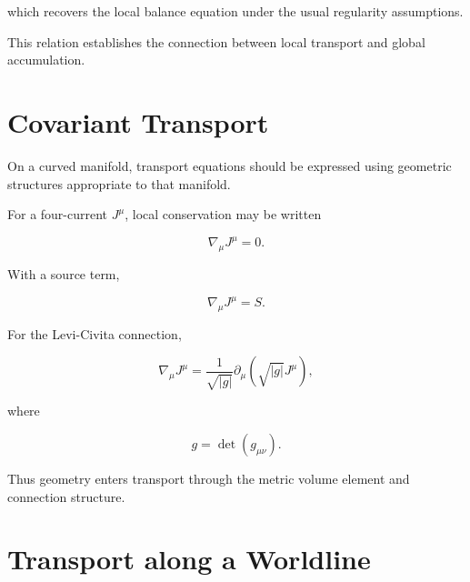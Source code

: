 \documentclass[12pt,oneside]{book}
\begin{document}
which recovers the local balance equation under the usual
regularity assumptions.

This relation establishes the connection between local transport
and global accumulation.


\section{Covariant Transport}
\label{sec:covariant-transport}

On a curved manifold, transport equations should be expressed
using geometric structures appropriate to that manifold.

For a four-current \(J^\mu\), local conservation may be written

\begin{equation}
    \nabla_\mu J^\mu
    =
    0.
    \label{eq:covariant-current-conservation}
\end{equation}

With a source term,

\begin{equation}
    \nabla_\mu J^\mu
    =
    S.
    \label{eq:covariant-current-source}
\end{equation}

For the Levi-Civita connection,

\begin{equation}
    \nabla_\mu J^\mu
    =
    \frac{1}{\sqrt{|g|}}
    \partial_\mu
    \left(
        \sqrt{|g|}
        J^\mu
    \right),
    \label{eq:covariant-divergence}
\end{equation}

where

\begin{equation}
    g
    =
    \det(g_{\mu\nu}).
\end{equation}

Thus geometry enters transport through the metric volume element
and connection structure.


\section{Transport along a Worldline}
\label{sec:transport-worldline}
\end{document}
